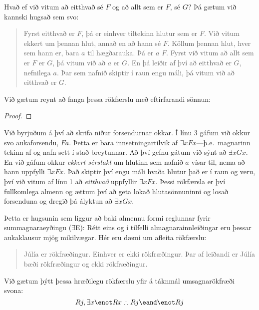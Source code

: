Hvað ef við vitum að eitthvað sé $F$ og að allt sem er $F$, sé $G$? Þá gætum við kannski hugsað sem svo:
 	\begin{quote}
		Fyrst eitthvað er $F$, þá er einhver tiltekinn hlutur sem er $F$. Við vitum ekkert um þennan hlut, annað en að hann sé $F$. Köllum þennan hlut, hver sem hann er, bara $a$ til hægðarauka. Þá er $a$ $F$. Fyrst við vitum að allt sem er $F$ er $G$, þá vitum við að $a$ er $G$. En þá leiðir af því að eitthvað er $G$, nefnilega $a$. Þar sem nafnið skiptir í raun engu máli, þá vitum við að eitthvað er $G$. 
	\end{quote}
Við gætum reynt að fanga þessa rökfærslu með eftirfarandi sönnun:
\begin{proof}
	\open
		 
	\close
\end{proof}\noindent
Við byrjuðum á því að skrifa niður forsendurnar okkar. Í línu 3 gáfum við okkur svo aukaforsendu, $Fa$. Þetta er bara innsetningartilvik af $\exists x Fx$---þ.e.\ magnarinn tekinn af og nafn sett í stað breytunnar. Að því gefnu gátum við sýnt að $\exists x Gx$. En við gáfum okkur \emph{ekkert sérstakt} um hlutinn sem nafnið $a$ vísar til, nema að hann uppfylli $\exists x Fx$. Það skiptir því engu máli hvaða hlutur það er í raun og veru, því við vitum af línu 1 að \emph{eitthvað} uppfyllir $\exists x Fx$. Þessi rökfærsla er því fullkomlega almenn og ættum því að geta lokað hlutasönnuninni og losað forsenduna og dregið þá ályktun að $\exists x Gx$.

Þetta er hugsunin sem liggur að baki almennu formi reglunnar fyrir summagnaraeyðingu ($\exists$E):
Rétt eins og í tilfelli almagnarainnleiðingar eru þessar aukaklausur mjög mikilvægar. Hér eru dæmi um afleita rökfærslu:
	\begin{quote}
		Júlía er rökfræðingur. Einhver er ekki rökfræðingur. Þar af leiðandi er Júlía bæði rökfræðingur og ekki rökfræðingur.
	\end{quote}
Við gætum þýtt þessa hræðilegu rökfærslu yfir á táknmál umsagnarökfræði svona:
$$Rj, \exists x \enot Rx \therefore Rj \eand \enot Rj$$

